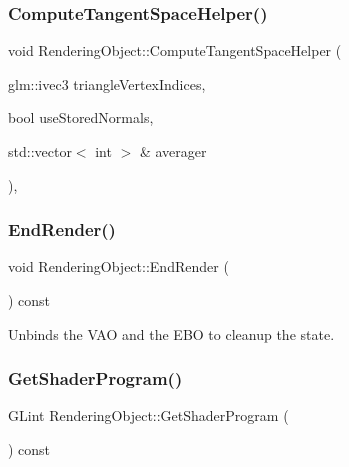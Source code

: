 \hypertarget{class_rendering_object_a053e68759fe406779c6b6cfa080602bf}{}\label{class_rendering_object_a053e68759fe406779c6b6cfa080602bf} 
\subsubsection{\texorpdfstring{Compute\+Tangent\+Space\+Helper()}{ComputeTangentSpaceHelper()}}
{\footnotesize\ttfamily void Rendering\+Object\+::\+Compute\+Tangent\+Space\+Helper (\begin{DoxyParamCaption}\item[{glm\+::ivec3}]{triangle\+Vertex\+Indices,  }\item[{bool}]{use\+Stored\+Normals,  }\item[{std\+::vector$<$ int $>$ \&}]{averager }\end{DoxyParamCaption})\hspace{0.3cm}{\ttfamily [private]}, {\ttfamily [virtual]}}

\hypertarget{class_rendering_object_abc5f87208a9c918f3d281dd673cb5a24}{}\label{class_rendering_object_abc5f87208a9c918f3d281dd673cb5a24} 
\subsubsection{\texorpdfstring{End\+Render()}{EndRender()}}
{\footnotesize\ttfamily void Rendering\+Object\+::\+End\+Render (\begin{DoxyParamCaption}{ }\end{DoxyParamCaption}) const\hspace{0.3cm}{\ttfamily [virtual]}}



Unbinds the V\+AO and the E\+BO to cleanup the state. 

\hypertarget{class_rendering_object_abe3637190e30c5483e9505743c75bcdb}{}\label{class_rendering_object_abe3637190e30c5483e9505743c75bcdb} 
\subsubsection{\texorpdfstring{Get\+Shader\+Program()}{GetShaderProgram()}}
{\footnotesize\ttfamily G\+Lint Rendering\+Object\+::\+Get\+Shader\+Program (\begin{DoxyParamCaption}{ }\end{DoxyParamCaption}) const}



